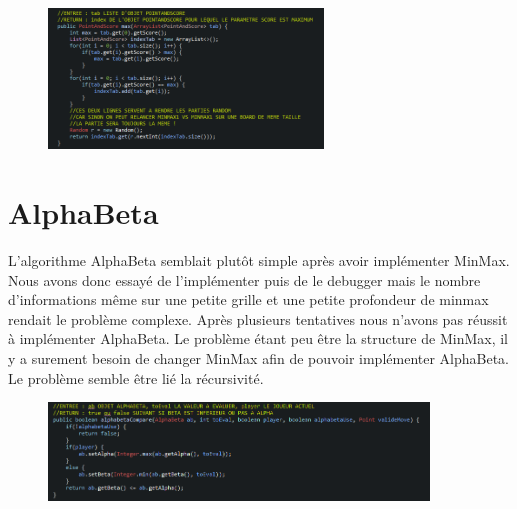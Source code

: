 \begin{figure}[!ht]
\begin{center}
\includegraphics[width=0.65\textwidth]{./MAX}
\end{center}
\end{figure}

\newpage

\section{AlphaBeta}

L'algorithme AlphaBeta semblait plutôt simple après avoir implémenter MinMax.
Nous avons donc essayé de l'implémenter puis de le debugger mais le nombre d'informations
même sur une petite grille et une petite profondeur de minmax rendait le problème complexe.
Après plusieurs tentatives nous n'avons pas réussit à implémenter AlphaBeta.
Le problème étant peu être la structure de MinMax, il y a surement besoin de changer MinMax
afin de pouvoir implémenter AlphaBeta. Le problème semble être lié la récursivité.

\begin{figure}[!ht]
\begin{center}
\includegraphics[width=0.90\textwidth]{./ALPHABETA}
\end{center}
\end{figure}


